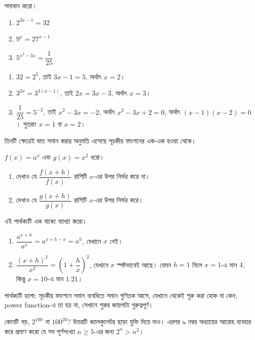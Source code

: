 \documentclass[11pt]{article}
\begin{document}
 সমাধান করো।
\begin{enumerate}
  \item $2^{3x-1} = 32$
  \item $9^{x} = 27^{x-1}$
  \item $5^{x^{2}-3x} = \dfrac{1}{25}$
\end{enumerate}

\begin{sol}
\begin{enumerate}
  \item $32 = 2^{5}$, তাই $3x - 1 = 5$, অর্থাৎ $x = 2$।
  \item $3^{2x} = 3^{3(x-1)}$, তাই $2x = 3x - 3$, অর্থাৎ $x = 3$।
  \item $\dfrac{1}{25} = 5^{-2}$, তাই $x^{2} - 3x = -2$, অর্থাৎ
        $x^{2} - 3x + 2 = 0$, অর্থাৎ $(x-1)(x-2) = 0$। সুতরাং $x = 1$ বা
        $x = 2$।
\end{enumerate}
তিনটি ক্ষেত্রেই ঘাত সমান করার অনুমতি এসেছে সূচকীয় ফাংশনের এক-এক হওয়া থেকে।
\end{sol}

 $f(x) = a^{x}$ এবং $g(x) = x^{2}$ ধরো।
\begin{enumerate}
  \item দেখাও যে $\dfrac{f(x+h)}{f(x)}$ রাশিটি $x$-এর উপর নির্ভর করে না।
  \item দেখাও যে $\dfrac{g(x+h)}{g(x)}$ রাশিটি $x$-এর উপর নির্ভর করে।
\end{enumerate}
এই পার্থক্যটি এক বাক্যে ব্যাখ্যা করো।

\begin{sol}
\begin{enumerate}
  \item $\dfrac{a^{x+h}}{a^{x}} = a^{x+h-x} = a^{h}$, যেখানে $x$ নেই।
  \item $\dfrac{(x+h)^{2}}{x^{2}} = \left( 1 + \dfrac{h}{x} \right)^{2}$, যেখানে
        $x$ স্পষ্টভাবেই আছে। যেমন $h = 1$ নিলে $x = 1$-এ মান $4$, কিন্তু
        $x = 10$-এ মান $1.21$।
\end{enumerate}
পার্থক্যটি হলো: সূচকীয় ফাংশনে সমান ব্যবধিতে সমান গুণিতক আসে, যেখানে থেকেই শুরু
করা হোক না কেন; power function-এ তা হয় না, সেখানে শুরুর জায়গাটা গুরুত্বপূর্ণ।
\end{sol}

 কোনটি বড়, $2^{100}$ না $100^{20}$? উত্তরটি ক্যালকুলেটর ছাড়া যুক্তি দিয়ে
দাও। এরপর ৯ নম্বর অধ্যায়ের আরোহ ব্যবহার করে প্রমাণ করো যে সব পূর্ণসংখ্যা
$n \geq 5$-এর জন্য $2^{n} > n^{2}$।
\end{document}

